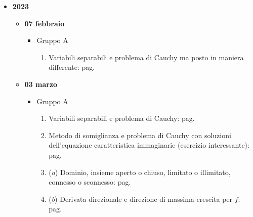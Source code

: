 \documentclass[a4paper]{article}
\begin{document}
	\begin{itemize}
		\item \textbf{2023}
		\begin{itemize}
			\item \textbf{07 febbraio}
			\begin{itemize}
				\item Gruppo A
				\begin{enumerate}[label*=Ex. \arabic*), leftmargin = 4em]
					\item Variabili separabili e problema di Cauchy ma posto in maniera differente: pag.~\hyperlink{
						exam: esame 07 febbraio 2023 - Gruppo A - 1 esercizio
					}{
					}
				\end{enumerate}
			\end{itemize}

			\item \textbf{03 marzo}
			\begin{itemize}
				\item Gruppo A
				\begin{enumerate}[label*=Ex. \arabic*), leftmargin = 4em]
					\item Variabili separabili e problema di Cauchy: pag.~\hyperlink{
						exam: esame 03 marzo 2023 - Gruppo A - 1 esercizio
					}{
					}

					\item Metodo di somiglianza e problema di Cauchy con soluzioni dell'equazione caratteristica immaginarie (esercizio interessante): pag.~\hyperlink{
						exam: esame 03 marzo 2023 - Gruppo A - 2 esercizio
					}{
					}

					\item (\emph{a}) Dominio, insieme aperto o chiuso, limitato o illimitato, connesso o sconnesso: pag.~\hyperlink{
						exam: esame 03 marzo 2023 - Gruppo A - 3 esercizio (a)
					}{
					}

					\setcounter{enumi}{2}

					\item (\emph{b}) Derivata direzionale e direzione di massima crescita per $f$: pag.~\hyperlink{
						exam: esame 03 marzo 2023 - Gruppo A - 3 esercizio (b)
					}{
					}


\end{enumerate}
\end{itemize}
\end{itemize}
\end{itemize}
\end{document}
